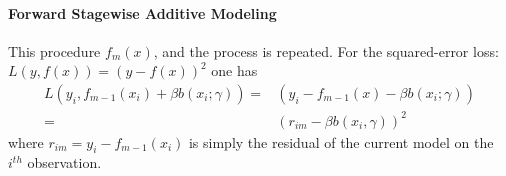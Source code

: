 \paragraph{Forward Stagewise Additive Modeling}
 This procedure $f_{m}(x)$,
and the process is repeated.
For the squared-error loss: $L(y,f(x))=\left(y-f(x)\right)^{2}$ one has 
\begin{align*}
L(y_{i},f_{m-1}(x_{i})+\beta b(x_{i};\gamma)) =& \left(y_{i}-f_{m-1}(x)-\beta 
b(x_{i};\gamma)\right)\\
=& \left(r_{im}-\beta b(x_{i},\gamma)\right)^{2}
\end{align*}
where $r_{im}=y_{i}-f_{m-1}(x_{i})$ is simply the residual of the current model on the $i^{th}$
observation.

